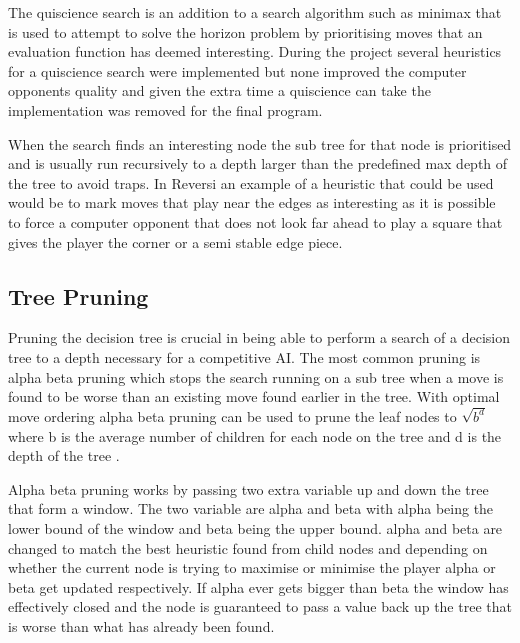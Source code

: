 \documentclass[final]{cmpreport}
\begin{document}
The quiscience search is an addition to a search algorithm such as minimax that is used to attempt to solve the horizon problem by prioritising moves that an evaluation function has deemed interesting. During the project several heuristics for a quiscience search were implemented but none improved the computer opponents quality and given the extra time a quiscience can take the implementation was removed for the final program.

When the search finds an interesting node the sub tree for that node is prioritised and is usually run recursively to a depth larger than the predefined max depth of the tree to avoid traps. In Reversi an example of a heuristic that could be used would be to mark moves that play near the edges as interesting as it is possible to force a computer opponent that does not look far ahead to play a square that gives the player the corner or a semi stable edge piece.
\subsection{Tree Pruning}
Pruning the decision tree is crucial in being able to perform a search of a decision tree to a depth necessary for a competitive AI. The most common pruning is alpha beta pruning which stops the search running on a sub tree when a move is found to be worse than an existing move found earlier in the tree. With optimal move ordering alpha beta pruning can be used to prune the leaf nodes to $\sqrt{b^d}$ where b is the average number of children for each node on the tree and d is the depth of the tree \citet{ABmaths}.

Alpha beta pruning works by passing two extra variable up and down the tree that form a window. The two variable are alpha and beta with alpha being the lower bound of the window and beta being the upper bound. alpha and beta are changed to match the best heuristic found from child nodes and depending on whether the current node is trying to maximise or minimise the player alpha or beta get updated respectively. If alpha ever gets bigger than beta the window has effectively closed and the node is guaranteed to pass a value back up the tree that is worse than what has already been found.
\end{document}
